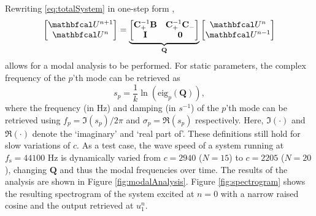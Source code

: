 Rewriting \eqref{eq:totalSystem} in one-step form \cite{bilbao2009}, 
\begin{equation}\label{eq:oneStepForm}
    \begin{bmatrix}
        \U^{n+1}\\
        \U^n
    \end{bmatrix} = 
    \underbrace{\begin{bmatrix}
        \mathbf{C}_+^{-1}\mathbf{B} & \mathbf{C}_+^{-1}\mathbf{C}_-\\
        \mathbf{I} & \mathbf{0}
    \end{bmatrix}}_{\mathbf{Q}}
    \begin{bmatrix}
        \U^n\\
        \U^{n-1}
    \end{bmatrix}
\end{equation}
allows for a modal analysis to be performed. For static parameters, the complex frequency of the $p$'th mode can be retrieved as
\begin{equation}\label{eq:modalAnalysis}
    s_p = \frac{1}{k}\ln \left(\text{eig}_p(\mathbf{Q})\right),
\end{equation}
where the frequency (in Hz) and damping (in $s^{-1}$) of the $p$'th mode can be retrieved using $f_p = \mathfrak{I}(s_p)/2\pi$ and $\sigma_p = \mathfrak{R}(s_p)$
respectively. Here, $\mathfrak{I}(\cdot)$ and $\mathfrak{R}(\cdot)$ denote the `imaginary' and `real part of'. These definitions still hold for slow variations of $c$. As a test case, the wave speed of a system running at $f_\text{s} = 44100$ Hz is dynamically varied from $c = 2940$ ($N = 15$) to $c = 2205$ ($N = 20$), changing $\mathbf{Q}$ and thus the modal frequencies over time. %
The results of the analysis are shown in Figure \ref{fig:modalAnalysis}. Figure \ref{fig:spectrogram} shows the resulting spectrogram of the system excited at $n=0$ with a narrow raised cosine and the output retrieved at $u_1^n$.

